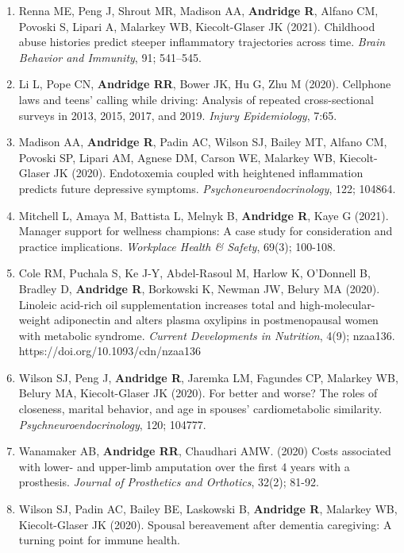 \documentclass[
  english,
  letterpaper,
  DIV=11,
  numbers=noendperiod]{scrartcl}
\begin{document}
\begin{enumerate}
  Cross-sectional analysis of toddlers. \emph{Journal of Developmental
  \& Behavioral Pediatrics}, 42(6); 442-449.
\item
  Renna ME, Peng J, Shrout MR, Madison AA, \textbf{Andridge R}, Alfano
  CM, Povoski S, Lipari A, Malarkey WB, Kiecolt-Glaser JK (2021).
  Childhood abuse histories predict steeper inflammatory trajectories
  across time. \emph{Brain Behavior and Immunity}, 91; 541--545.
\item
  Li L, Pope CN, \textbf{Andridge RR}, Bower JK, Hu G, Zhu M (2020).
  Cellphone laws and teens' calling while driving: Analysis of repeated
  cross-sectional surveys in 2013, 2015, 2017, and 2019. \emph{Injury
  Epidemiology}, 7:65.
\item
  Madison AA, \textbf{Andridge R}, Padin AC, Wilson SJ, Bailey MT,
  Alfano CM, Povoski SP, Lipari AM, Agnese DM, Carson WE, Malarkey WB,
  Kiecolt-Glaser JK (2020). Endotoxemia coupled with heightened
  inflammation predicts future depressive symptoms.
  \emph{Psychoneuroendocrinology}, 122; 104864.
\item
  Mitchell L, Amaya M, Battista L, Melnyk B, \textbf{Andridge R}, Kaye G
  (2021). Manager support for wellness champions: A case study for
  consideration and practice implications. \emph{Workplace Health \&
  Safety}, 69(3); 100-108.
\item
  Cole RM, Puchala S, Ke J-Y, Abdel-Rasoul M, Harlow K, O'Donnell B,
  Bradley D, \textbf{Andridge R}, Borkowski K, Newman JW, Belury MA
  (2020). Linoleic acid-rich oil supplementation increases total and
  high-molecular-weight adiponectin and alters plasma oxylipins in
  postmenopausal women with metabolic syndrome. \emph{Current
  Developments in Nutrition}, 4(9); nzaa136.
  https://doi.org/10.1093/cdn/nzaa136
\item
  Wilson SJ, Peng J, \textbf{Andridge R}, Jaremka LM, Fagundes CP,
  Malarkey WB, Belury MA, Kiecolt-Glaser JK (2020). For better and
  worse? The roles of closeness, marital behavior, and age in spouses'
  cardiometabolic similarity. \emph{Psychneuroendocrinology}, 120;
  104777.
\item
  Wanamaker AB, \textbf{Andridge RR}, Chaudhari AMW. (2020) Costs
  associated with lower- and upper-limb amputation over the first 4
  years with a prosthesis. \emph{Journal of Prosthetics and Orthotics},
  32(2); 81-92.
\item
  Wilson SJ, Padin AC, Bailey BE, Laskowski B, \textbf{Andridge R},
  Malarkey WB, Kiecolt-Glaser JK (2020). Spousal bereavement after
  dementia caregiving: A turning point for immune health.

\end{enumerate}
\end{document}

